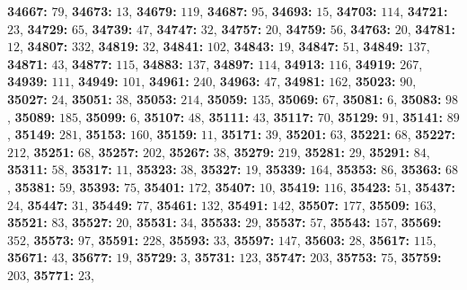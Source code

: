 \textsf{\bfseries 34667:} $79$, \textsf{\bfseries 34673:} $13$, \textsf{\bfseries 34679:} $119$, \textsf{\bfseries 34687:} $95$, \textsf{\bfseries 34693:} $15$, \textsf{\bfseries 34703:} $114$, \textsf{\bfseries 34721:} $23$, \textsf{\bfseries 34729:} $65$, \textsf{\bfseries 34739:} $47$, \textsf{\bfseries 34747:} $32$, \textsf{\bfseries 34757:} $20$, \textsf{\bfseries 34759:} $56$, \textsf{\bfseries 34763:} $20$, \textsf{\bfseries 34781:} $12$, \textsf{\bfseries 34807:} $332$, \textsf{\bfseries 34819:} $32$, \textsf{\bfseries 34841:} $102$, \textsf{\bfseries 34843:} $19$, \textsf{\bfseries 34847:} $51$, \textsf{\bfseries 34849:} $137$, \textsf{\bfseries 34871:} $43$, \textsf{\bfseries 34877:} $115$, \textsf{\bfseries 34883:} $137$, \textsf{\bfseries 34897:} $114$, \textsf{\bfseries 34913:} $116$, \textsf{\bfseries 34919:} $267$, \textsf{\bfseries 34939:} $111$, \textsf{\bfseries 34949:} $101$, \textsf{\bfseries 34961:} $240$, \textsf{\bfseries 34963:} $47$, \textsf{\bfseries 34981:} $162$, \textsf{\bfseries 35023:} $90$, \textsf{\bfseries 35027:} $24$, \textsf{\bfseries 35051:} $38$, \textsf{\bfseries 35053:} $214$, \textsf{\bfseries 35059:} $135$, \textsf{\bfseries 35069:} $67$, \textsf{\bfseries 35081:} $6$, \textsf{\bfseries 35083:} $98$, \textsf{\bfseries 35089:} $185$, \textsf{\bfseries 35099:} $6$, \textsf{\bfseries 35107:} $48$, \textsf{\bfseries 35111:} $43$, \textsf{\bfseries 35117:} $70$, \textsf{\bfseries 35129:} $91$, \textsf{\bfseries 35141:} $89$, \textsf{\bfseries 35149:} $281$, \textsf{\bfseries 35153:} $160$, \textsf{\bfseries 35159:} $11$, \textsf{\bfseries 35171:} $39$, \textsf{\bfseries 35201:} $63$, \textsf{\bfseries 35221:} $68$, \textsf{\bfseries 35227:} $212$, \textsf{\bfseries 35251:} $68$, \textsf{\bfseries 35257:} $202$, \textsf{\bfseries 35267:} $38$, \textsf{\bfseries 35279:} $219$, \textsf{\bfseries 35281:} $29$, \textsf{\bfseries 35291:} $84$, \textsf{\bfseries 35311:} $58$, \textsf{\bfseries 35317:} $11$, \textsf{\bfseries 35323:} $38$, \textsf{\bfseries 35327:} $19$, \textsf{\bfseries 35339:} $164$, \textsf{\bfseries 35353:} $86$, \textsf{\bfseries 35363:} $68$, \textsf{\bfseries 35381:} $59$, \textsf{\bfseries 35393:} $75$, \textsf{\bfseries 35401:} $172$, \textsf{\bfseries 35407:} $10$, \textsf{\bfseries 35419:} $116$, \textsf{\bfseries 35423:} $51$, \textsf{\bfseries 35437:} $24$, \textsf{\bfseries 35447:} $31$, \textsf{\bfseries 35449:} $77$, \textsf{\bfseries 35461:} $132$, \textsf{\bfseries 35491:} $142$, \textsf{\bfseries 35507:} $177$, \textsf{\bfseries 35509:} $163$, \textsf{\bfseries 35521:} $83$, \textsf{\bfseries 35527:} $20$, \textsf{\bfseries 35531:} $34$, \textsf{\bfseries 35533:} $29$, \textsf{\bfseries 35537:} $57$, \textsf{\bfseries 35543:} $157$, \textsf{\bfseries 35569:} $352$, \textsf{\bfseries 35573:} $97$, \textsf{\bfseries 35591:} $228$, \textsf{\bfseries 35593:} $33$, \textsf{\bfseries 35597:} $147$, \textsf{\bfseries 35603:} $28$, \textsf{\bfseries 35617:} $115$, \textsf{\bfseries 35671:} $43$, \textsf{\bfseries 35677:} $19$, \textsf{\bfseries 35729:} $3$, \textsf{\bfseries 35731:} $123$, \textsf{\bfseries 35747:} $203$, \textsf{\bfseries 35753:} $75$, \textsf{\bfseries 35759:} $203$, \textsf{\bfseries 35771:} $23$, 
